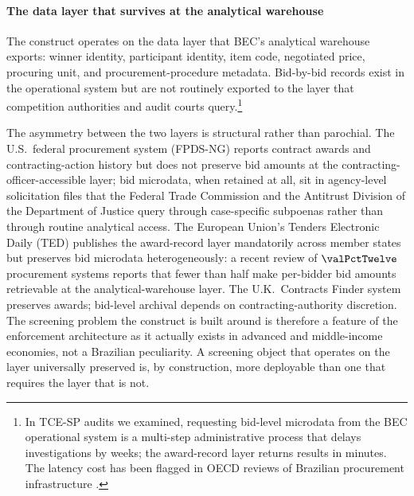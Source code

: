 \paragraph{The data layer that survives at the analytical
warehouse} The construct operates on the data layer that BEC's
analytical warehouse exports: winner identity, participant
identity, item code, negotiated price, procuring unit, and
procurement-procedure metadata. Bid-by-bid records exist in the
operational system but are not routinely exported to the layer
that competition authorities and audit courts query.\footnote{In
TCE-SP audits we examined, requesting bid-level microdata from
the BEC operational system is a multi-step administrative
process that delays investigations by weeks; the award-record
layer returns results in minutes. The latency cost has been
flagged in OECD reviews of Brazilian procurement infrastructure
\citep{oecd2019government}.}

The asymmetry between the two layers is structural rather than
parochial. The U.S.~federal procurement system (FPDS-NG) reports
contract awards and contracting-action history but does not
preserve bid amounts at the contracting-officer-accessible
layer; bid microdata, when retained at all, sit in agency-level
solicitation files that the Federal Trade Commission and the
Antitrust Division of the Department of Justice query through
case-specific subpoenas rather than through routine analytical
access. The European Union's Tenders Electronic Daily (TED)
publishes the award-record layer mandatorily across member
states but preserves bid microdata heterogeneously: a recent
review of $\valPctTwelve$ procurement systems
\citep{sanchezgraells2019screening} reports that fewer than half
make per-bidder bid amounts retrievable at the analytical-warehouse
layer. The U.K.\ Contracts Finder system preserves awards;
bid-level archival depends on contracting-authority discretion.
The screening problem the construct is built around is therefore
a feature of the enforcement architecture as it actually exists
in advanced and middle-income economies, not a Brazilian
peculiarity. A screening object that operates on the layer
universally preserved is, by construction, more deployable than
one that requires the layer that is not.

